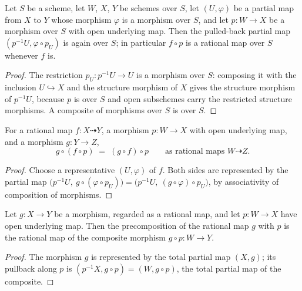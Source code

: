\begin{lemma}
  \label{lem:ratmap_precomp_over}
  \leanok
  Let \(S\) be a scheme, let \(W\), \(X\), \(Y\) be schemes over \(S\), let
  \((U, \varphi)\) be a partial map from \(X\) to \(Y\) whose morphism
  \(\varphi\) is a morphism over \(S\), and let \(p : W \to X\) be a morphism
  over \(S\) with open underlying map. Then the pulled-back partial map
  \((p^{-1}U, \varphi \circ p_U)\) is again over \(S\); in particular \(f \circ p\)
  is a rational map over \(S\) whenever \(f\) is.
\end{lemma}
\begin{proof}
  \leanok
  The restriction \(p_U : p^{-1}U \to U\) is a morphism over \(S\): composing it
  with the inclusion \(U \hookrightarrow X\) and the structure morphism of \(X\)
  gives the structure morphism of \(p^{-1}U\), because \(p\) is over \(S\) and
  open subschemes carry the restricted structure morphisms. A composite of
  morphisms over \(S\) is over \(S\).
\end{proof}

\begin{lemma}
  \label{lem:ratmap_precomp_compHom}
  \leanok
  For a rational map \(f : X \dashrightarrow Y\), a morphism \(p : W \to X\) with
  open underlying map, and a morphism \(g : Y \to Z\),
  \[
    g \circ (f \circ p) \;=\; (g \circ f) \circ p
    \qquad\text{as rational maps } W \dashrightarrow Z .
  \]
\end{lemma}
\begin{proof}
  \leanok
  Choose a representative \((U, \varphi)\) of \(f\). Both sides are represented
  by the partial map \(\bigl(p^{-1}U,\ g \circ (\varphi \circ p_U)\bigr)
  = \bigl(p^{-1}U,\ (g \circ \varphi) \circ p_U\bigr)\), by associativity of
  composition of morphisms.
\end{proof}

\begin{lemma}
  \label{lem:ratmap_precomp_morphism}
  \leanok
  Let \(g : X \to Y\) be a morphism, regarded as a rational map, and let
  \(p : W \to X\) have open underlying map. Then the precomposition of the
  rational map \(g\) with \(p\) is the rational map of the composite morphism
  \(g \circ p : W \to Y\).
\end{lemma}
\begin{proof}
  \leanok
  The morphism \(g\) is represented by the total partial map \((X, g)\); its
  pullback along \(p\) is \((p^{-1}X, g \circ p) = (W, g \circ p)\), the total
  partial map of the composite.
\end{proof}

